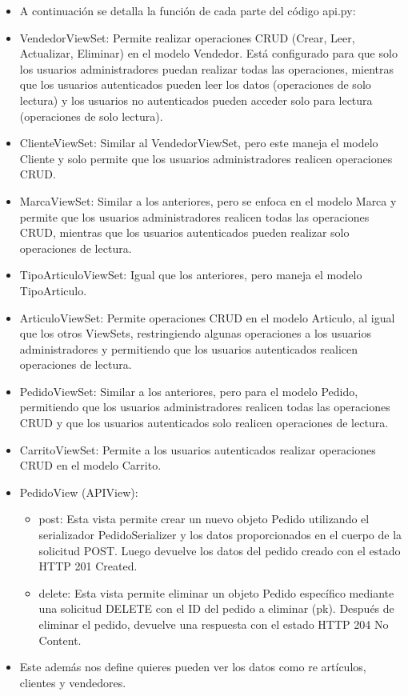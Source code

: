 \documentclass{article}
\begin{document}
    \begin{itemize}
        \item A continuación se detalla la función de cada parte del código api.py:
        \item VendedorViewSet: Permite realizar operaciones CRUD (Crear, Leer, Actualizar, Eliminar) en el modelo Vendedor. Está configurado para que solo los usuarios administradores puedan realizar todas las operaciones, mientras que los usuarios autenticados pueden leer los datos (operaciones de solo lectura) y los usuarios no autenticados pueden acceder solo para lectura (operaciones de solo lectura).
        \item ClienteViewSet: Similar al VendedorViewSet, pero este maneja el modelo Cliente y solo permite que los usuarios administradores realicen operaciones CRUD.
        \item MarcaViewSet: Similar a los anteriores, pero se enfoca en el modelo Marca y permite que los usuarios administradores realicen todas las operaciones CRUD, mientras que los usuarios autenticados pueden realizar solo operaciones de lectura.
        \item TipoArticuloViewSet: Igual que los anteriores, pero maneja el modelo TipoArticulo.
        \item ArticuloViewSet: Permite operaciones CRUD en el modelo Articulo, al igual que los otros ViewSets, restringiendo algunas operaciones a los usuarios administradores y permitiendo que los usuarios autenticados realicen operaciones de lectura.
        \item PedidoViewSet: Similar a los anteriores, pero para el modelo Pedido, permitiendo que los usuarios administradores realicen todas las operaciones CRUD y que los usuarios autenticados solo realicen operaciones de lectura.
        \item CarritoViewSet: Permite a los usuarios autenticados realizar operaciones CRUD en el modelo Carrito.
        \item PedidoView (APIView):
        \begin{itemize}
            \item post: Esta vista permite crear un nuevo objeto Pedido utilizando el serializador PedidoSerializer y los datos proporcionados en el cuerpo de la solicitud POST. Luego devuelve los datos del pedido creado con el estado HTTP 201 Created.
            \item delete: Esta vista permite eliminar un objeto Pedido específico mediante una solicitud DELETE con el ID del pedido a eliminar (pk). Después de eliminar el pedido, devuelve una respuesta con el estado HTTP 204 No Content.
        \end{itemize}
        \item Este además nos define quieres pueden ver los datos como re artículos, clientes y vendedores.
    \end{itemize}
    
\end{document}
